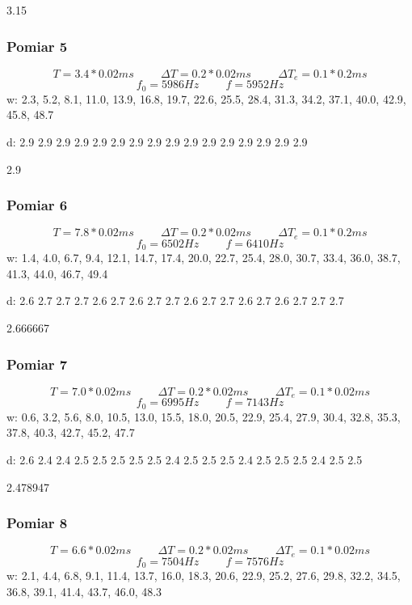 \documentclass[12pt,a4paper]{article}
\begin{document}
3.15
\subsubsection{Pomiar 5}
$$
T = 3.4*0.02ms \hspace{1cm} \Delta T = 0.2*0.02ms \hspace{1cm} \Delta T_e = 0.1*0.2ms 
$$
$$
f_0 = 5986 Hz \hspace{1cm} f=5952Hz
$$
w: 2.3, 5.2, 8.1, 11.0, 13.9, 16.8, 19.7, 22.6, 25.5, 28.4, 31.3, 34.2, 37.1, 40.0, 42.9, 45.8, 48.7

d: 2.9 2.9 2.9 2.9 2.9 2.9 2.9 2.9 2.9 2.9 2.9 2.9 2.9 2.9 2.9 2.9

2.9
\subsubsection{Pomiar 6}
$$
T = 7.8*0.02ms \hspace{1cm} \Delta T = 0.2*0.02ms \hspace{1cm} \Delta T_e = 0.1*0.2ms 
$$
$$
f_0 = 6502 Hz \hspace{1cm} f=6410Hz
$$
w: 1.4, 4.0, 6.7, 9.4, 12.1, 14.7, 17.4, 20.0, 22.7, 25.4, 28.0, 30.7, 33.4, 36.0, 38.7, 41.3, 44.0, 46.7, 49.4

d: 2.6 2.7 2.7 2.7 2.6 2.7 2.6 2.7 2.7 2.6 2.7 2.7 2.6 2.7 2.6 2.7 2.7 2.7

2.666667
\subsubsection{Pomiar 7}
$$
T = 7.0*0.02ms \hspace{1cm} \Delta T = 0.2*0.02ms \hspace{1cm} \Delta T_e = 0.1*0.02ms 
$$
$$
f_0 = 6995 Hz \hspace{1cm} f=7143Hz
$$
w: 0.6, 3.2, 5.6, 8.0, 10.5, 13.0, 15.5, 18.0, 20.5, 22.9, 25.4, 27.9, 30.4, 32.8, 35.3, 37.8, 40.3, 42.7, 45.2, 47.7

d: 2.6 2.4 2.4 2.5 2.5 2.5 2.5 2.5 2.4 2.5 2.5 2.5 2.4 2.5 2.5 2.5 2.4 2.5 2.5

2.478947
\subsubsection{Pomiar 8}
$$
T = 6.6*0.02ms \hspace{1cm} \Delta T = 0.2*0.02ms \hspace{1cm} \Delta T_e = 0.1*0.02ms 
$$
$$
f_0 = 7504 Hz \hspace{1cm} f=7576Hz
$$
w: 2.1, 4.4, 6.8, 9.1, 11.4, 13.7, 16.0, 18.3, 20.6, 22.9, 25.2, 27.6, 29.8, 32.2, 34.5, 36.8, 39.1, 41.4, 43.7, 46.0, 48.3
\end{document}
